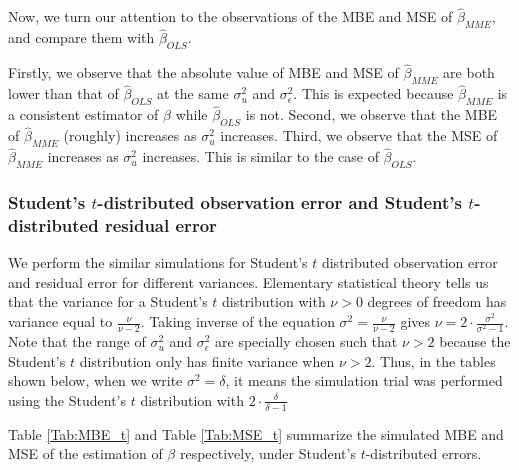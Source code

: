 \documentclass{article}
\begin{document}
Now, we turn our attention to the observations of the MBE and MSE of $\hat{\beta}_{MME}$, and compare them with $\hat{\beta}_{OLS}$.

Firstly, we observe that the absolute value of MBE and MSE of $\hat{\beta}_{MME}$ are both lower than that of $\hat{\beta}_{OLS}$ at the same $\sigma^2_u$ and $\sigma^2_\epsilon$.
This is expected because $\hat{\beta}_{MME}$ is a consistent estimator of $\beta$ while $\hat{\beta}_{OLS}$ is not.
Second, we observe that the MBE of $\hat{\beta}_{MME}$ (roughly) increases as $\sigma^2_u$ increases.
Third, we observe that the MSE of $\hat{\beta}_{MME}$ increases as $\sigma^2_u$ increases. This is similar to the case of $\hat{\beta}_{OLS}$.

\subsubsection{Student's $t$-distributed observation error and Student's $t$-distributed residual error}

We perform the similar simulations for Student's $t$ distributed observation error and residual error for different variances.
Elementary statistical theory tells us that the variance for a Student's $t$ distribution with $\nu > 0$ degrees of freedom has variance equal to $\frac{\nu}{\nu-2}$.
Taking inverse of the equation $\sigma^2 = \frac{\nu}{\nu-2}$ gives $\nu = 2 \cdot \frac{\sigma^2}{\sigma^2-1}$.
Note that the range of $\sigma^2_u$ and $\sigma^2_\epsilon$ are specially chosen such that $\nu > 2$ because the Student's $t$ distribution only has finite variance when $\nu > 2$.
Thus, in the tables shown below, when we write $\sigma^2 = \delta$, it means the simulation trial was performed using the Student's $t$ distribution with $2 \cdot \frac{\delta}{\delta-1}$

Table \ref{Tab:MBE_t} and Table \ref{Tab:MSE_t} summarize the simulated MBE and MSE of the estimation of $\beta$ respectively, under Student's $t$-distributed errors.
\end{document}
